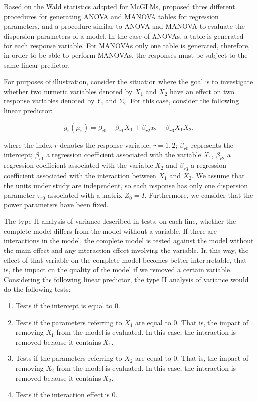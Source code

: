 \documentclass[article]{jss}\usepackage[]{graphicx}\usepackage[]{xcolor}
\begin{document}
Based on the Wald statistics adapted for McGLMs, \citet{htmcglm_proposta} proposed three different procedures for generating ANOVA and MANOVA tables for regression parameters, and a procedure similar to ANOVA and MANOVA to evaluate the dispersion parameters of a model. In the case of ANOVAs, a table is generated for each response variable. For MANOVAs only one table is generated, therefore, in order to be able to perform MANOVAs, the responses must be subject to the same linear predictor.

For purposes of illustration, consider the situation where the goal is to investigate whether two numeric variables denoted by $X_1$ and $X_2$ have an effect on two response variables denoted by $Y_1$ and $Y_2$. For this case, consider the following linear predictor:

$$
g_r(\mu_r) = \beta_{r0} + \beta_{r1} X_1 + \beta_{r2} x_2 + \beta_{r3} X_1X_2.
$$

\noindent where the index $r$ denotes the response variable, $r = 1,2$; $\beta_{r0}$ represents the intercept; $\beta_{r1}$ a regression coefficient associated with the variable $X_1$, $\beta_{r2}$ a regression coefficient associated with the variable $X_2$ and $\beta_{r3}$ a regression coefficient associated with the interaction between $X_1$ and $X_2$. We assume that the units under study are independent, so each response has only one dispersion parameter $\tau_{r0}$ associated with a matrix $Z_0 = I$. Furthermore, we consider that the power parameters have been fixed.

The type II analysis of variance described in \citet{htmcglm_proposta} tests, on each line, whether the complete model differs from the model without a variable. If there are interactions in the model, the complete model is tested against the model without the main effect and any interaction effect involving the variable. In this way, the effect of that variable on the complete model becomes better interpretable, that is, the impact on the quality of the model if we removed a certain variable. Considering the following linear predictor, the type II analysis of variance would do the following tests:

\begin{enumerate}
  \item Tests if the intercept is equal to $0$.
  
  \item Tests if the parameters referring to $X_1$ are equal to $0$. That is, the impact of removing $X_1$ from the model is evaluated. In this case, the interaction is removed because it contains $X_1$.
  
  \item Tests if the parameters referring to $X_2$ are equal to $0$. That is, the impact of removing $X_2$ from the model is evaluated. In this case, the interaction is removed because it contains $X_2$.
  
  \item Tests if the interaction effect is $0$.

\end{enumerate}
\end{document}
